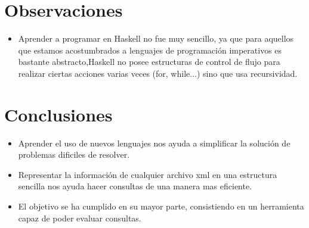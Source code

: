 \documentclass[11pt]{article} %
\begin{document}
\section{Observaciones}
\begin{itemize}
\item Aprender a programar en  Haskell no fue muy sencillo, ya que para aquellos que estamos acostumbrados a lenguajes de programación  imperativos es bastante abstracto,Haskell  no  posee estructuras de control de flujo para realizar ciertas acciones varias veces (for, while...) sino que usa recursividad.

\end{itemize}
\section{ Conclusiones}

\begin{itemize}
\item Aprender el uso de nuevos lenguajes nos ayuda a simplificar la solución de problemas dificiles de resolver.
\item Representar la información de cualquier archivo xml en una estructura sencilla nos ayuda hacer consultas de una manera mas eficiente. 
\item El objetivo se ha cumplido en su mayor parte, consistiendo en un herramienta capaz de  poder evaluar
consultas. 
\end {itemize}
\end{document}
